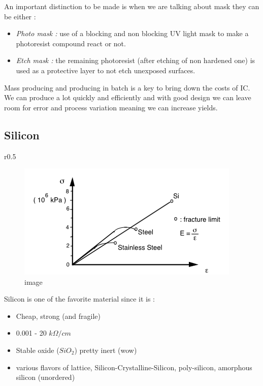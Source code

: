 \documentclass[
]{article}
\begin{document}
An important distinction to be made is when we are talking about mask
they can be either :

\begin{itemize}
\item
  \emph{Photo mask :} use of a blocking and non blocking UV light mask
  to make a photoresist compound react or not.
\item
  \emph{Etch mask :} the remaining photoresist (after etching of non
  hardened one) is used as a protective layer to not etch unexposed
  surfaces.
\end{itemize}

Mass producing and producing in batch is a key to bring down the costs
of IC. We can produce a lot quickly and efficiently and with good design
we can leave room for error and process variation meaning we can
increase yields.

\hypertarget{silicon}{%
\subsection{Silicon}\label{silicon}}

r0.5

\begin{figure}
\centering
\includegraphics[width=0.95\textwidth,height=\textheight]{resistivity_Si.png}
\caption{image}
\end{figure}

Silicon is one of the favorite material since it is :

\begin{itemize}
\item
  Cheap, strong (and fragile)
\item
  0.001 - 20 \(k\Omega/cm\)
\item
  Stable oxide (\(SiO_2\)) pretty inert (wow)
\item
  various flavors of lattice, Silicon-Crystalline-Silicon, poly-silicon,
  amorphous silicon (unordered)
\end{itemize}
\end{document}
